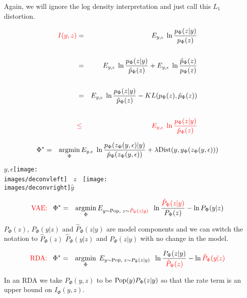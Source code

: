 {\vfill
Again, we will ignore the log density interpretation and just call this $L_1$ distortion.


\begin{eqnarray*}
{\color{red} I(y,z)}  & = & E_{y,\epsilon}\;\ln \frac{p_\Phi(z|y)}{p_{\Phi}(z)} \\
\\
& = & E_{y,\epsilon}\;\ln \frac{p_\Phi(z|y)}{\hat{p}_\Phi(z)} + E_{y,\epsilon}\;\ln\frac{\hat{p}_\Phi(z)}{p_{\Phi}(z)} \\
\\
& = & E_{y,\epsilon}\;\ln \frac{p_\Phi(z|y)}{\hat{p}_\Phi(z)} - KL(p_{\Phi}(z),\hat{p}_\Phi(z)) \\
\\
& {\color{red} \leq} & {\color{red} E_{y,\epsilon}\;\ln \frac{p_\Phi(z|y)}{\hat{p}_\Phi(z)}}
\end{eqnarray*}


{\huge
\begin{eqnarray*}
\Phi^* & = & \operatorname*{argmin}_\Phi E_{y,\epsilon}\;\ln \frac{p_\Phi(z_\Phi(y,\epsilon)|y)}{\hat{p}_\Phi(z_\Phi(y,\epsilon))}
+ \lambda \mathrm{Dist}(y,y_\Phi(z_\Phi(y,\epsilon)))
\end{eqnarray*}

\vfill
\centerline{$y,\epsilon$\texttt{[image: \\images/deconvleft]} $\;\;z\;\;$ \texttt{[image: \\images/deconvright]}$\hat{y}$}


{\huge
\begin{eqnarray*}
\mbox{\color{red} VAE:}\;\;\;\Phi^*  & = & \operatorname*{argmin}_\Phi E_{y \sim \mathrm{Pop},\;z \sim {\color{red} \hat{P}_\Phi(z|y)}}\;\; \ln \frac{{\color{red} \hat{P}_\Phi(z|y)}}{P_\Phi(z)}  - \ln P_\Phi(y|z)
\end{eqnarray*}
}

\vfill
$P_\Phi(z)$, $P_\Phi(y|z)$ and $\hat{P}_\Phi(z|y)$ are model components and we can switch the notation to $\hat{P}_\Phi(z)$ $\hat{P}_\Phi(y|z)$ and $P_\Phi(z|y)$
with no change in the model.

\vfill
{\huge
\begin{eqnarray*}
\mbox{\color{red} RDA:}\;\;\;\Phi^*  & = & \operatorname*{argmin}_\Phi\; E_{y \sim \mathrm{Pop},\;z \sim P_\Phi(z|y)} \;\;\ln \frac{P_\Phi(z|y)}{\color{red} \hat{P}_\Phi(z)}  - \ln {\color{red} \hat{P}_\Phi(y|z)}
\end{eqnarray*}
}

\vfill
In an RDA we take $P_\Phi(y,z)$ to be $\mathrm{Pop}(y)P_\Phi(z|y)$ so that the rate term is an upper bound on $I_\Phi(y,z)$.

}}
